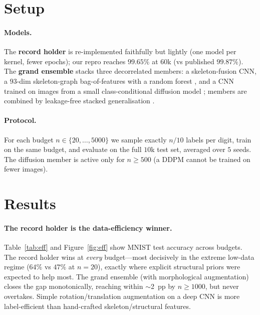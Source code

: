 \documentclass{article}
\begin{document}
\section{Setup}
\paragraph{Models.} The \textbf{record holder} \cite{An2020} is re-implemented faithfully but
lightly (one model per kernel, fewer epochs); our repro reaches $99.65\%$ at $60$k (vs published
$99.87\%$). The \textbf{grand ensemble} stacks three decorrelated members: a skeleton-fusion CNN,
a $93$-dim skeleton-graph bag-of-features with a random forest \cite{Breiman2001,GuoHall1989},
and a CNN trained on images from a small class-conditional diffusion model
\cite{Ho2020,Song2021}; members are combined by leakage-free stacked generalisation
\cite{Wolpert1992}.
\paragraph{Protocol.} For each budget $n\in\{20,\dots,5000\}$ we sample exactly $n/10$ labels per
digit, train on the same budget, and evaluate on the full $10$k test set, averaged over $5$
seeds. The diffusion member is active only for $n\!\geq\!500$ (a DDPM cannot be trained on fewer
images).

\section{Results}
\paragraph{The record holder is the data-efficiency winner.}
Table~\ref{tab:eff} and Figure~\ref{fig:eff} show MNIST test accuracy across budgets. The record
holder wins at \emph{every} budget---most decisively in the extreme low-data regime ($64\%$ vs
$47\%$ at $n\!=\!20$), exactly where explicit structural priors were expected to help most. The
grand ensemble (with morphological augmentation) closes the gap monotonically, reaching within
$\sim$2~pp by $n\!\geq\!1000$, but never overtakes. Simple rotation/translation augmentation on a
deep CNN is more label-efficient than hand-crafted skeleton/structural features.
\end{document}
